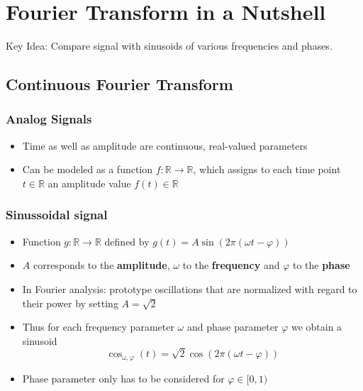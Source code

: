



%
\section{Fourier Transform in a Nutshell}
Key Idea: Compare signal with sinusoids of various frequencies and phases. 

\subsection{Continuous Fourier Transform}
\subsubsection*{Analog Signals}
\begin{itemize}
    \item
        Time as well as amplitude are continuous, real-valued parameters
    \item
        Can be modeled as a function $f: \mathbb{R} \rightarrow \mathbb{R}$, which assigns to each time point $t \in \mathbb{R}$ an amplitude value $f(t) \in \mathbb{R}$
\end{itemize}
\subsubsection*{Sinussoidal signal}
\begin{itemize}
    \item
        Function $g: \mathbb{R} \rightarrow \mathbb{R}$ defined by $g(t) = A \sin(2\pi(\omega t - \varphi))$
    \item
        $A$ corresponds to the \textbf{amplitude}, $\omega$ to the \textbf{frequency} and $\varphi$ to the \textbf{phase}
    \item
        In Fourier analysis: prototype oscillations that are normalized with regard to their power by setting $A = \sqrt2$
    \item
        Thus for each frequency parameter $\omega$ and phase parameter $\varphi$ we obtain a sinusoid 
        $$\cos_{\omega, \varphi}(t) = \sqrt2 \cos(2\pi(\omega t - \varphi))$$
    \item
        Phase parameter only has to be considered for $\varphi \in [0, 1)$
\end{itemize}
